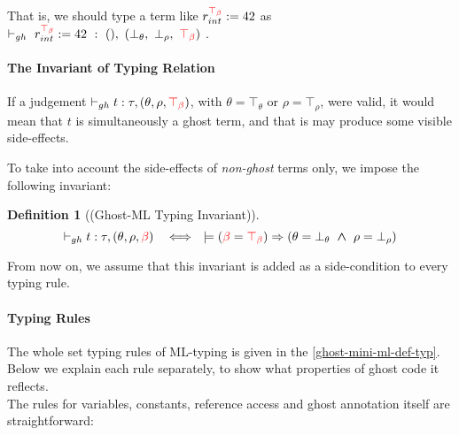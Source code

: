 \documentclass[a4paper,11pt,oneside]{article}
\theoremstyle{plain}
\newtheorem{definition}{Definition}[subsection]
\newcommand{\rouge}[1]{\textcolor{red}{#1}}
\newcommand{\bwedge}{\boldsymbol{~\wedge~}}
\newcommand{\ghosttyping}[6]{\vdash_{gh}~#1~:~#2,~(#3,~#4,~\rouge{#5})~\textcolor{blue}{\boldsymbol{#6}}}
\newcommand{\bth}{\bot_\theta}
\newcommand{\brh}{\bot_\rho}
\newcommand{\tth}{\top_\theta}
\newcommand{\trh}{\top_\rho}
\newcommand{\gb}{\beta}
\newcommand{\gbt}{\top_\beta}
\newcommand{\gbr}{\textcolor{red}{\gb}}
\newcommand{\gbtr}{\textcolor{red}{\gbt}}
\begin{document}
That is, we should type a term like $r_{int}^{\gbtr} := 42 $ as 
$\ghosttyping{r_{int}^{\gbtr} := 42}{()}{\bth}{\brh}{\gbtr}{}$.

\paragraph*{The Invariant of Typing Relation}	
	
If a judgement $\vdash_{gh} t : \tau, (\theta, \rho, \gbtr)$, with $\theta = \tth$ or $\rho = \trh $, were valid, it would mean that $t$ is simultaneously a ghost term, and that is may produce some visible side-effects.

To take into account the side-effects of \textit{non-ghost} terms only, we impose the following invariant:

\begin{definition}[(Ghost-ML Typing Invariant)]
 $$\vdash_{gh} t : \tau, (\theta, \rho, \gbr) 
 ~~ \iff ~~
\models (\gbr = \gbtr) \Rightarrow (\theta = \bth \bwedge \rho = \brh) $$
\end{definition}   

From now on, we assume that this invariant is added as a
side-condition to every typing rule.

\paragraph*{Typing Rules}	

The whole set typing rules of ML-typing is given in the \ref{ghost-mini-ml-def-typ}.
Below we explain each rule separately, to show what properties of ghost code it reflects. \\

The rules for variables, constants, reference access and ghost annotation itself are straightforward:  
\end{document}
